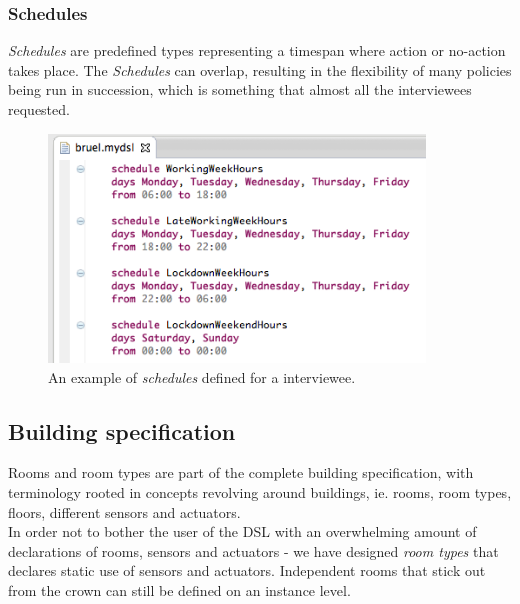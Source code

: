 \documentclass{llncs}
\begin{document}
\newpage
\subsubsection{Schedules}\label{subsubsec:schedules}
\textit{Schedules} are predefined types representing a timespan where action or no-action takes place. The \textit{Schedules} can overlap, resulting in the flexibility of many policies being run in succession, which is something that almost all the interviewees requested.

\begin{figure}
  	\centering
    \includegraphics[width=10cm]{dsl-schedules.png}
	\caption{An example of \textit{schedules} defined for a interviewee.}
	\label{fig:dsl-schedules}
\end{figure}

\newpage
\subsection{Building specification}\label{subsec:buildingspecification}
Rooms and room types are part of the complete building specification, with terminology rooted in concepts revolving around buildings, ie. rooms, room types, floors, different sensors and actuators. \\

In order not to bother the user of the DSL with an overwhelming amount of declarations of rooms, sensors and actuators - we have designed \textit{room types} that declares static use of sensors and actuators. Independent rooms that stick out from the crown can still be defined on an instance level.
\end{document}
